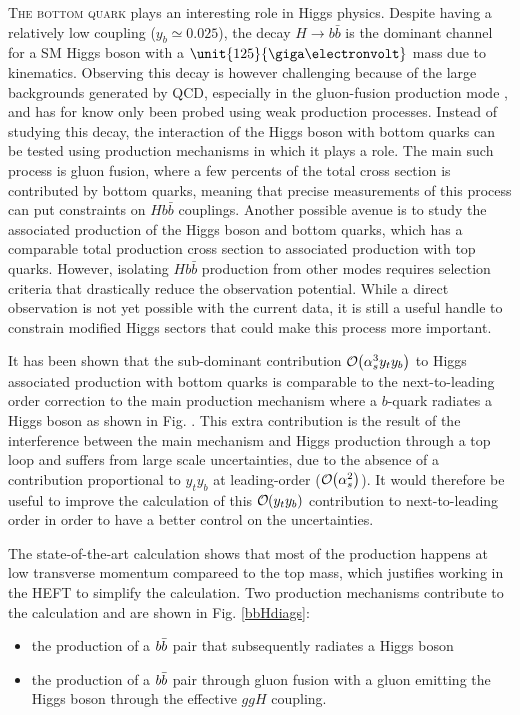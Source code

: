\lettrine[findent=0.2em,nindent=0.2em]{T}{he bottom quark} plays an interesting role in Higgs physics. Despite having a relatively low coupling ($y_b\simeq 0.025$), the decay $H\to b\bar b$ is the dominant channel for a SM Higgs boson with a $\unit{125}{\giga\electronvolt}$ mass due to kinematics. Observing this decay is however challenging because of the large backgrounds generated by QCD, especially in the gluon-fusion production mode \cite{TheATLASCollaboration2016}, and has for know only been probed using weak production processes. Instead of studying this decay, the interaction of the Higgs boson with bottom quarks can be tested using production mechanisms in which it plays a role. The main such process is gluon fusion, where a few percents of the total cross section is contributed by bottom quarks, meaning that precise measurements of this process can put constraints on $Hb\bar b$ couplings. Another possible avenue is to study the associated production of the Higgs boson and bottom quarks, which has a comparable total production cross section to associated production with top quarks. However, isolating $Hb\bar b$ production from other modes requires selection criteria that drastically reduce the observation potential. While a direct observation is not yet possible with the current data, it is still a useful handle to constrain modified Higgs sectors that could make this process more important.


It has been shown \cite{Wiesemann:2014ioa} that the sub-dominant contribution ${\cal O}\hspace{-0.2em}\left(\alpha_s^3 y_t y_b\right)$ to Higgs associated production with bottom quarks is comparable to the next-to-leading order correction to the main production mechanism where a $b$-quark radiates a Higgs boson as shown in Fig. . This extra contribution is the result of the interference between the main mechanism and Higgs production through a top loop and suffers from large scale uncertainties, due to the absence of a contribution proportional to $y_t y_b$ at leading-order (${\cal O}\hspace{-0.2em}\left(\alpha_s^2\right)$). It would therefore be useful to improve the calculation of this ${\cal O}\hspace{-0.2em}\left(y_ty_b\right)$ contribution to next-to-leading order in order to have a better control on the uncertainties.

The state-of-the-art calculation shows that most of the production happens at low transverse momentum compareed to the top mass, which justifies working in the HEFT to simplify the calculation. Two production mechanisms contribute to the calculation and are shown in Fig. \ref{bbHdiags}:
\begin{itemize}
  \item the production of a $b \bar b$ pair that subsequently radiates a Higgs boson
  \item the production of a $b \bar b$ pair through gluon fusion with a gluon emitting the Higgs boson through the effective $ggH$ coupling.
\end{itemize}

